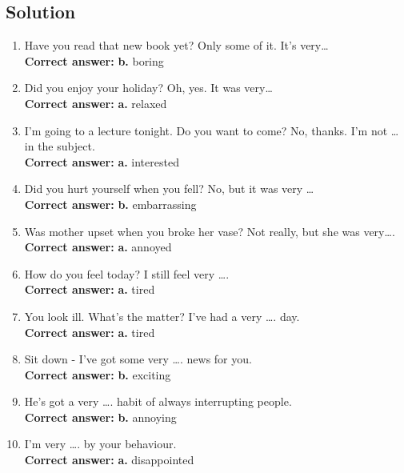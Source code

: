 \subsection*{Solution}
\begin{enumerate}
      \item {} Have you read that new book yet?  Only some of it. It’s very…\\
            \textbf{Correct answer:} \textbf{b.} boring

      \item {} Did you enjoy your holiday?  Oh, yes. It was very…\\
            \textbf{Correct answer:} \textbf{a.} relaxed

      \item {} I'm going to a lecture tonight. Do you want to come?  No, thanks. I'm not … in the subject.\\
            \textbf{Correct answer:} \textbf{a.} interested

      \item {} Did you hurt yourself when you fell?  No, but it was very …\\
            \textbf{Correct answer:} \textbf{b.} embarrassing

      \item {} Was mother upset when you broke her vase?  Not really, but she was very….\\
            \textbf{Correct answer:} \textbf{a.} annoyed

      \item {} How do you feel today?  I still feel very ….\\
            \textbf{Correct answer:} \textbf{a.} tired

      \item {} You look ill. What’s the matter?  I’ve had a very …. day.\\
            \textbf{Correct answer:} \textbf{a.} tired

      \item Sit down - I've got some very …. news for you.\\
            \textbf{Correct answer:} \textbf{b.} exciting

      \item He's got a very …. habit of always interrupting people.\\
            \textbf{Correct answer:} \textbf{b.} annoying

      \item I'm very …. by your behaviour.\\
            \textbf{Correct answer:} \textbf{a.} disappointed
\end{enumerate}

